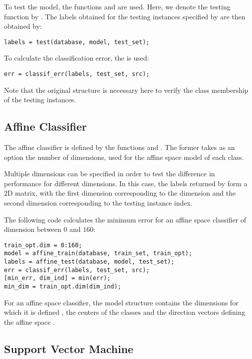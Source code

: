 \documentclass[twocolumn]{article}
\begin{document}
To test the model, the functions  and  are used. Here, we denote the testing function by . The labels obtained for the testing instances specified by  are then obtained by:
\begin{lstlisting}
labels = test(database, model, test_set);
\end{lstlisting}
To calculate the classification error, the  is used:
\begin{lstlisting}
err = classif_err(labels, test_set, src);
\end{lstlisting}
Note that the original  structure is necessary here to verify the class membership of the testing instances.

\subsection{Affine Classifier}

The affine classifier is defined by the functions  and . The former takes as an option the number of dimensions,  used for the affine space model of each class. 

Multiple dimensions can be specified in order to test the difference in performance for different dimensions. In this case, the labels returned by  form a 2D matrix, with the first dimension corresponding to the dimension and the second dimension corresponding to the testing instance index.

The following code calculates the minimum error for an affine space classifier of dimension between $0$ and $160$:
\begin{lstlisting}
train_opt.dim = 0:160;
model = affine_train(database, train_set, train_opt);
labels = affine_test(database, model, test_set);
err = classif_err(labels, test_set, src);
[min_err, dim_ind] = min(err);
min_dim = train_opt.dim(dim_ind);
\end{lstlisting}

For an affine space classifier, the model structure contains the dimensions for which it is defined , the centers of the classes  and the direction vectors defining the affine space .

\subsection{Support Vector Machine}
\end{document}
